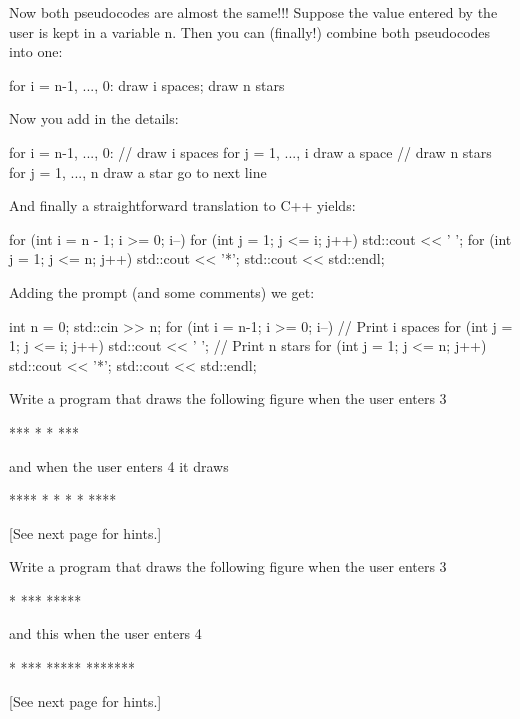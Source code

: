 \begin{console}
Now both pseudocodes are almost the same!!! Suppose the value entered by
the user is kept in a variable n. Then you can (finally!) combine both
pseudocodes into one:
\begin{console}
for i = n-1, ..., 0:
        draw i spaces; draw n stars
\end{console}

Now you add in the details:
\begin{console}
for i = n-1, ..., 0:
      // draw i spaces
      for j = 1, ..., i
          draw a space
      // draw n stars
      for j = 1, ..., n
          draw a star
      go to next line
\end{console}

And finally a straightforward translation to C++ yields:
\begin{console}
for (int i = n - 1; i >= 0; i--)
{   
    for (int j = 1; j <= i; j++)
    {
        std::cout << ' ';
    }
    for (int j = 1; j <= n; j++)
    {
        std::cout << '*';
    }
    std::cout << std::endl;
}
\end{console}
Adding the prompt (and some comments) we get:
\begin{console}
int n = 0;
std::cin >> n;
for (int i = n-1; i >= 0; i--)
{   
    // Print i spaces
    for (int j = 1; j <= i; j++)
    {
        std::cout << ' ';
    }
    // Print n stars
    for (int j = 1; j <= n; j++)
    {
        std::cout << '*';
    }
    std::cout << std::endl;
}
\end{console}
\begin{ex} Write a program that draws the following figure when
the user enters 3
\begin{console}
***
* *
***
\end{console}
and when the user enters 4 it draws
\begin{console}
****
*  *
*  *
****
\end{console}
\end{ex}

[See next page for hints.]

\begin{ex}
Write a program that draws the following figure when
the user enters 3
\begin{console}
  *
 ***
*****
\end{console}
and this when the user enters 4
\begin{console}
   *
  ***
 *****
*******
\end{console}
\end{ex}
[See next page for hints.]


\end{console}
